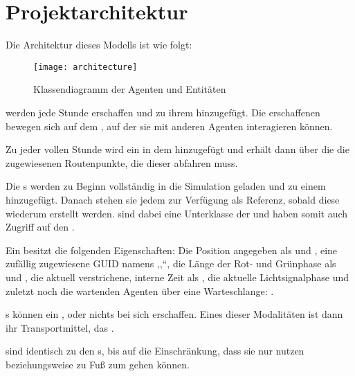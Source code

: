 %


\section{Projektarchitektur}\label{sec:projectarchitecture}

Die Architektur dieses Modells ist wie folgt:

\begin{figure}[h]
    \centering
    \texttt{[image: architecture]}
    \caption{Klassendiagramm der Agenten und Entitäten}
    \label{fig:class-diagramm}
\end{figure}

 werden jede Stunde erschaffen und zu ihrem  hinzugefügt.
Die erschaffenen  bewegen sich auf dem , auf der sie mit anderen Agenten interagieren können.

Zu jeder vollen Stunde wird ein  in dem  hinzugefügt und erhält dann über die  die zugewiesenen Routenpunkte, die dieser abfahren muss.

Die s werden zu Beginn vollständig in die Simulation geladen und zu einem  hinzugefügt.
Danach stehen sie jedem  zur Verfügung als Referenz, sobald diese wiederum erstellt werden.
 sind dabei eine Unterklasse der  und haben somit auch Zugriff auf den .


Ein  besitzt die folgenden Eigenschaften: Die Position angegeben als  und , eine zufällig zugewiesene GUID namens ,,``, die Länge der Rot- und Grünphase als  und , die aktuell verstrichene, interne Zeit als , die aktuelle Lichtsignalphase  und zuletzt noch die wartenden Agenten über eine Warteschlange: .

s können ein ,  oder nichts bei sich erschaffen.
Eines dieser Modalitäten ist dann ihr Transportmittel, das .

 sind identisch zu den s, bis auf die Einschränkung, dass sie nur  nutzen beziehungsweise zu Fuß zum  gehen können.


